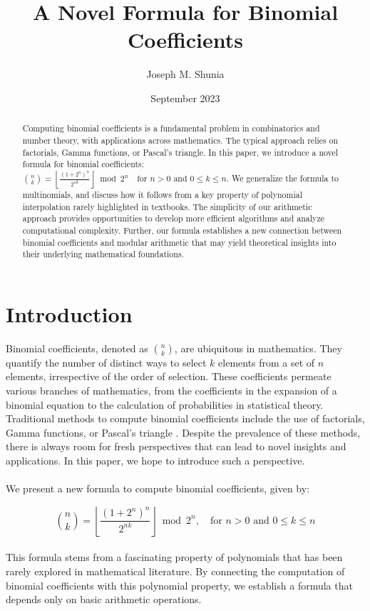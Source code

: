 \documentclass{article}
\title{A Novel Formula for Binomial Coefficients}
\author{Joseph M. Shunia}
\date{September 2023}
\theoremstyle{plain}
\theoremstyle{definition}
\begin{document}
\maketitle

\begin{abstract}
Computing binomial coefficients is a fundamental problem in combinatorics and number theory, with applications across mathematics. The typical approach relies on factorials, Gamma functions, or Pascal's triangle. In this paper, we introduce a novel formula for binomial coefficients: \(\binom{n}{k} = \left\lfloor\frac{(1 + 2^{n})^{n}}{2^{n k}}\right\rfloor \bmod{2^{n}} \quad \text{for } n > 0 \text{ and } 0 \leq k \leq n\). We generalize the formula to multinomials, and discuss how it follows from a key property of polynomial interpolation rarely highlighted in textbooks. The simplicity of our arithmetic approach provides opportunities to develop more efficient algorithms and analyze computational complexity. Further, our formula establishes a new connection between binomial coefficients and modular arithmetic that may yield theoretical insights into their underlying mathematical foundations.
\end{abstract}

\section{Introduction}
Binomial coefficients, denoted as \(\binom{n}{k}\), are ubiquitous in mathematics. They quantify the number of distinct ways to select \(k\) elements from a set of \(n\) elements, irrespective of the order of selection. These coefficients permeate various branches of mathematics, from the coefficients in the expansion of a binomial equation to the calculation of probabilities in statistical theory. Traditional methods to compute binomial coefficients include the use of factorials, Gamma functions, or Pascal's triangle \cite{brualdi2010intro}. Despite the prevalence of these methods, there is always room for fresh perspectives that can lead to novel insights and applications. In this paper, we hope to introduce such a perspective.
\\
\\
We present a new formula to compute binomial coefficients, given by:

\begin{equation}
\binom{n}{k} = \left\lfloor\frac{(1 + 2^{n})^{n}}{2^{n k}}\right\rfloor \bmod{2^{n}}, \quad \text{for } n > 0 \text{ and } 0 \leq k \leq n
\end{equation}
\\
This formula stems from a fascinating property of polynomials that has been rarely explored in mathematical literature. By connecting the computation of binomial coefficients with this polynomial property, we establish a formula that depends only on basic arithmetic operations.
\end{document}

